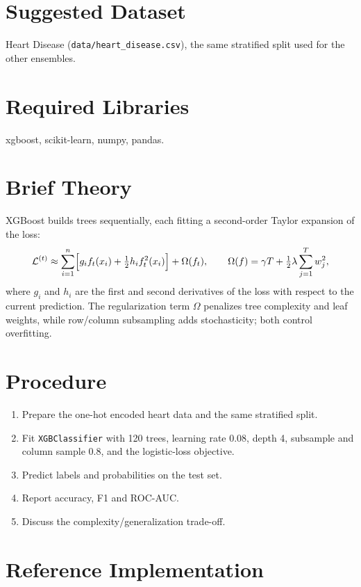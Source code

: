 \section{Suggested Dataset}
Heart Disease (\texttt{data/heart\_disease.csv}), the same stratified split used for the
other ensembles.

\section{Required Libraries}
xgboost, scikit-learn, numpy, pandas.

\section{Brief Theory}
XGBoost builds trees sequentially, each fitting a second-order Taylor expansion of the loss:
\[
\mathcal{L}^{(t)} \approx \sum_{i=1}^{n}\Bigl[g_i f_t(x_i) + \tfrac{1}{2} h_i f_t^2(x_i)\Bigr] + \Omega(f_t),
\qquad
\Omega(f) = \gamma T + \tfrac{1}{2}\lambda \sum_{j=1}^{T} w_j^2 ,
\]
where $g_i$ and $h_i$ are the first and second derivatives of the loss with respect to the
current prediction. The regularization term $\Omega$ penalizes tree complexity and leaf
weights, while row/column subsampling adds stochasticity; both control overfitting.

\section{Procedure}
\begin{enumerate}
  \item Prepare the one-hot encoded heart data and the same stratified split.
  \item Fit \texttt{XGBClassifier} with 120 trees, learning rate 0.08, depth 4, subsample and
        column sample 0.8, and the logistic-loss objective.
  \item Predict labels and probabilities on the test set.
  \item Report accuracy, F1 and ROC-AUC.
  \item Discuss the complexity/generalization trade-off.
\end{enumerate}

\section{Reference Implementation}



